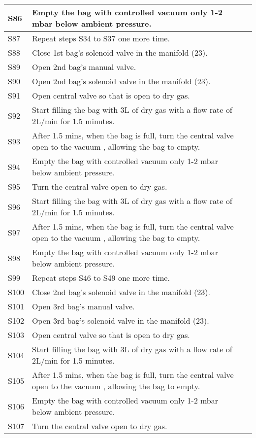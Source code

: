 \begin{longtable} {|m{}|m{}|m{}|}
S86 & Empty the bag with controlled vacuum only 1-2 mbar below ambient pressure. & \\ \hline
S87 & Repeat steps S34 to S37 one more time. & \\ \hline
S88 & Close 1st bag's solenoid valve in the manifold (23). & \\ \hline
S89 & Open 2nd bag's manual valve. & \\ \hline
S90 & Open 2nd bag's solenoid valve in the manifold (23). & \\ \hline
S91 & Open central valve so that is open to dry gas. & \\ \hline
S92 & Start filling the bag with 3L of dry gas with a flow rate of 2L/min for 1.5 minutes. & \\ \hline
S93 & After 1.5 mins, when the bag is full, turn the central valve open to the vacuum , allowing the bag to empty. & \\ \hline
S94 & Empty the bag with controlled vacuum only 1-2 mbar below ambient pressure. & \\ \hline
S95 & Turn the central valve open to dry gas. & \\ \hline
S96 & Start filling the bag with 3L of dry gas with a flow rate of 2L/min for 1.5 minutes. & \\ \hline
S97 & After 1.5 mins, when the bag is full, turn the central valve open to the vacuum , allowing the bag to empty. & \\ \hline
S98 & Empty the bag with controlled vacuum only 1-2 mbar below ambient pressure. & \\ \hline
S99 & Repeat steps S46 to S49 one more time. & \\ \hline
S100 & Close 2nd bag's solenoid valve in the manifold (23). & \\ \hline
S101 & Open 3rd bag's manual valve. & \\ \hline
S102 & Open 3rd bag's solenoid valve in the manifold (23). & \\ \hline
S103 & Open central valve so that is open to dry gas. & \\ \hline
S104 & Start filling the bag with 3L of dry gas with a flow rate of 2L/min for 1.5 minutes. & \\ \hline
S105 & After 1.5 mins, when the bag is full, turn the central valve open to the vacuum , allowing the bag to empty. & \\ \hline
S106 & Empty the bag with controlled vacuum only 1-2 mbar below ambient pressure. & \\ \hline
S107 & Turn the central valve open to dry gas. & \\ \hline

\end{longtable}
